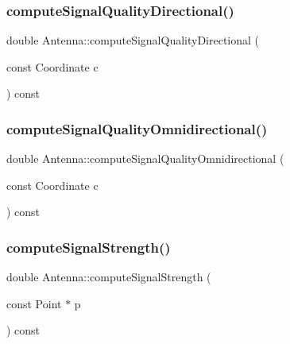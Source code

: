 \subsubsection{\texorpdfstring{compute\+Signal\+Quality\+Directional()}{computeSignalQualityDirectional()}}
{\footnotesize\ttfamily double Antenna\+::compute\+Signal\+Quality\+Directional (\begin{DoxyParamCaption}\item[{const Coordinate}]{c }\end{DoxyParamCaption}) const\hspace{0.3cm}{\ttfamily [private]}}

\mbox{\label{class_antenna_a036e212fda08a9fc5215732378fc4fbd}} 
\subsubsection{\texorpdfstring{compute\+Signal\+Quality\+Omnidirectional()}{computeSignalQualityOmnidirectional()}}
{\footnotesize\ttfamily double Antenna\+::compute\+Signal\+Quality\+Omnidirectional (\begin{DoxyParamCaption}\item[{const Coordinate}]{c }\end{DoxyParamCaption}) const\hspace{0.3cm}{\ttfamily [private]}}

\mbox{\label{class_antenna_a228297a3cb00c11fab97d615b4817656}} 
\subsubsection{\texorpdfstring{compute\+Signal\+Strength()}{computeSignalStrength()}\hspace{0.1cm}{\footnotesize\ttfamily [1/2]}}
{\footnotesize\ttfamily double Antenna\+::compute\+Signal\+Strength (\begin{DoxyParamCaption}\item[{const Point $\ast$}]{p }\end{DoxyParamCaption}) const}

